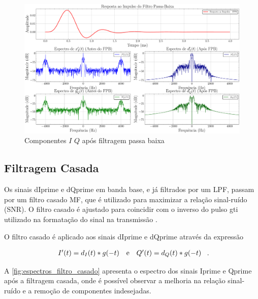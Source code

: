 \begin{figure}[H]
	\centering
	\caption{Componentes $I$ $Q$ após filtragem passa baixa}\label{fig:espectros_filtragem_comparacao}
	\includegraphics[width=\linewidth]{assets/espectros_filtragem_comparacao.pdf}
    
\end{figure}

\subsection{Filtragem Casada}

Os sinais \gls{dIprime} e \gls{dQprime} em banda base, e já filtrados por um \gls{LPF}, passam por um filtro casado \gls{MF}, que é utilizado para maximizar a relação sinal-ruído (\gls{SNR}). O filtro casado é ajustado para coincidir com o inverso do pulso  \gls{gti} utilizado na formatação do sinal na transmissão \cite{10555531840}. 

O filtro casado é aplicado aos sinais \gls{dIprime} e \gls{dQprime} através da expressão

\vspace{-1em}
\begin{equation}
    \begin{array}{c@{\quad\text{e}\quad}c}
        I'(t) = d_I(t) * g(-t) &
        Q'(t) = d_Q(t) * g(-t)
    \end{array} \text{ .}
\end{equation}


A \autoref{fig:espectros_filtro_casado} apresenta o espectro dos sinais \gls{Iprime} e \gls{Qprime} após a filtragem casada, onde é possível observar a melhoria na relação sinal-ruído e a remoção de componentes indesejadas. 

